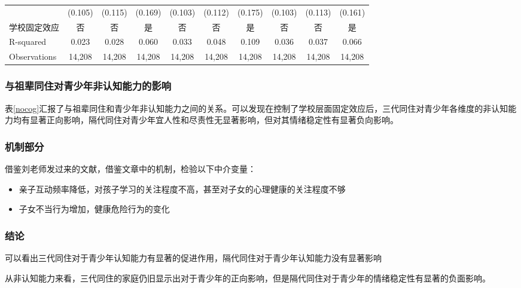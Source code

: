 \documentclass{beamer}
\begin{document}
\begin{frame}
\begin{table}[!htbp]
{\begin{tabular}{lccccccccc}
             & (0.105)    & (0.115)    & (0.169)    & (0.103)    & (0.112)    & (0.175)   & (0.103)    & (0.113)    & (0.161)    \\
学校固定效应       & 否          & 否          & 是          & 否          & 否          & 是         & 否          & 否          & 是          \\
R-squared    & 0.023      & 0.028      & 0.060      & 0.033      & 0.048      & 0.109     & 0.036      & 0.037      & 0.066      \\
Observations & 14,208     & 14,208     & 14,208     & 14,208     & 14,208     & 14,208    & 14,208     & 14,208     & 14,208   \\
\hline
\end{tabular}} %
\end{table}	
\end{frame}

\begin{frame}
	\frametitle{与祖辈同住对青少年非认知能力的影响}
表\ref{nocog}汇报了与祖辈同住和青少年非认知能力之间的关系。可以发现在控制了学校层面固定效应后，三代同住对青少年各维度的非认知能力均有显著正向影响，隔代同住对青少年宜人性和尽责性无显著影响，但对其情绪稳定性有显著负向影响。
\end{frame}

\begin{frame}[allowframebreaks]
	\frametitle{机制部分}
	借鉴刘老师发过来的文献，借鉴文章中的机制，检验以下中介变量：
	\begin{itemize}
		\item 亲子互动频率降低，对孩子学习的关注程度不高，甚至对子女的心理健康的关注程度不够
		\item 子女不当行为增加，健康危险行为的变化
		
	\end{itemize}
\end{frame}

\begin{frame}
	\frametitle{结论}
可以看出三代同住对于青少年认知能力有显著的促进作用，隔代同住对于青少年认知能力没有显著影响
\par 从非认知能力来看，三代同住的家庭仍旧显示出对于青少年的正向影响，但是隔代同住对于青少年的情绪稳定性有显著的负面影响。

\end{frame}



\end{document}
